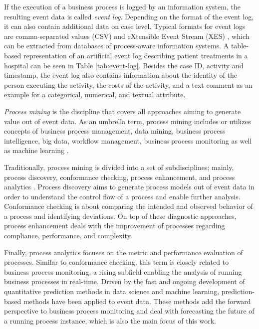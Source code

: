 If the execution of a business process is logged by an information system, the resulting event data is called \textit{event log}.
Depending on the format of the event log, it can also contain additional data on case level.
Typical formats for event logs are comma-separated values (CSV) and eXtensible Event Stream (XES) \cite{DBLP:conf/caise/VerbeekBDA10a}, which can be extracted from databases of process-aware information systems.
A table-based representation of an artificial event log describing patient treatments in a hospital can be seen in Table \ref{tab:event-log}.
Besides the case ID, activity and timestamp, the event log also contains information about the identity of the person executing the activity, the costs of the activity, and a text comment as an example for a categorical, numerical, and textual attribute.

\textit{Process mining} is the discipline that covers all approaches aiming to generate value out of event data.
As an umbrella term, process mining includes or utilizes concepts of business process management, data mining, business process intelligence, big data, workflow management, business process monitoring \cite{DBLP:books/sp/Aalst16} as well as machine learning \cite{DBLP:conf/bpm/VeitGMHT17}.

Traditionally, process mining is divided into a set of subdisciplines; mainly, process discovery, conformance checking, process enhancement, and process analytics \cite{DBLP:conf/caise/EckLLA15}.
Process discovery aims to generate process models out of event data in order to understand the control flow of a process and enable further analysis.
Conformance checking is about comparing the intended and observed behavior of a process and identifying deviations.
On top of these diagnostic approaches, process enhancement deals with the improvement of processes regarding compliance, performance, and complexity.

Finally, process analytics focuses on the metric and performance evaluation of processes. Similar to conformance checking, this term is closely related to business process monitoring, a rising subfield enabling the analysis of running business processes in real-time.
Driven by the fast and ongoing development of quantitative prediction methods in data science and machine learning, prediction-based methods have been applied to event data.
These methods add the forward perspective to business process monitoring and deal with forecasting the future of a running process instance, which is also the main focus of this work.


